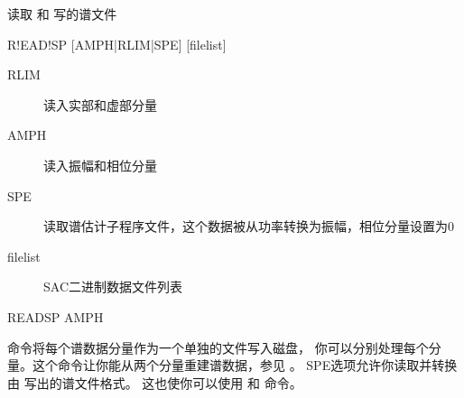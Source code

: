 \label{cmd:readsp}

读取  和  写的谱文件

\begin{SACSTX}
R!EAD!SP [AMPH|RLIM|SPE] [filelist]
\end{SACSTX}

\begin{description}
\item [RLIM]  读入实部和虚部分量
\item [AMPH]  读入振幅和相位分量
\item [SPE] 读取谱估计子程序文件，这个数据被从功率转换为振幅，相位分量设置为0
\item [filelist] SAC二进制数据文件列表
\end{description}

\begin{SACDFT}
READSP AMPH
\end{SACDFT}

 命令将每个谱数据分量作为一个单独的文件写入磁盘，
你可以分别处理每个分量。这个命令让你能从两个分量重建谱数据，参见 。
SPE选项允许你读取并转换由  写出的谱文件格式。
这也使你可以使用  和  命令。

